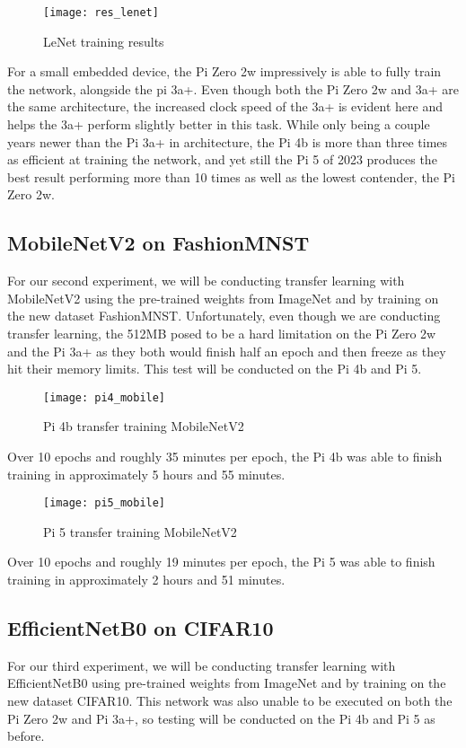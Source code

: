 \documentclass{article}
\begin{document}
\begin{multicols}{2}
\begin{figure}[H]
\texttt{[image: res\_lenet]}
\centering
\caption{LeNet training results}
\label{fig:pres_lenet}
\end{figure}
For a small embedded device, the Pi Zero 2w impressively is able to fully train the network, alongside the pi 3a+. Even though both the Pi Zero 2w and 3a+ are the same architecture, the increased clock speed of the 3a+ is evident here and helps the 3a+ perform slightly better in this task. While only being a couple years newer than the Pi 3a+ in architecture, the Pi 4b is more than three times as efficient at training the network, and yet still the Pi 5 of 2023 produces the best result performing more than 10 times as well as the lowest contender, the Pi Zero 2w. 

\subsection{MobileNetV2 on FashionMNST}
For our second experiment, we will be conducting transfer learning with MobileNetV2 using the pre-trained weights from ImageNet and by training on the new dataset FashionMNST. Unfortunately, even though we are conducting transfer learning, the 512MB posed to be a hard limitation on the Pi Zero 2w and the Pi 3a+ as they both would finish half an epoch and then freeze as they hit their memory limits. This test will be conducted on the Pi 4b and Pi 5.

\begin{figure}[H]
\texttt{[image: pi4\_mobile]}
\centering
\caption{Pi 4b transfer training MobileNetV2}
\label{fig:pi4_mobile}
\end{figure}
Over 10 epochs and roughly 35 minutes per epoch, the Pi 4b was able to finish training in approximately 5 hours and 55 minutes.

\begin{figure}[H]
\texttt{[image: pi5\_mobile]}
\centering
\caption{Pi 5 transfer training MobileNetV2}
\label{fig:pi5_mobile}
\end{figure}
Over 10 epochs and roughly 19 minutes per epoch, the Pi 5 was able to finish training in approximately 2 hours and 51 minutes.

\subsection{EfficientNetB0 on CIFAR10}
For our third experiment, we will be conducting transfer learning with EfficientNetB0 using pre-trained weights from ImageNet and by training on the new dataset CIFAR10. This network was also unable to be executed on both the Pi Zero 2w and Pi 3a+, so testing will be conducted on the Pi 4b and Pi 5 as before.


\end{multicols}
\end{document}
